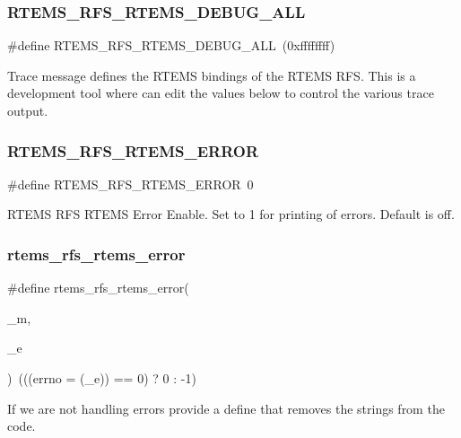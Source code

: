 \subsubsection{\texorpdfstring{RTEMS\_RFS\_RTEMS\_DEBUG\_ALL}{RTEMS\_RFS\_RTEMS\_DEBUG\_ALL}}
{\footnotesize\ttfamily \#define R\+T\+E\+M\+S\+\_\+\+R\+F\+S\+\_\+\+R\+T\+E\+M\+S\+\_\+\+D\+E\+B\+U\+G\+\_\+\+A\+LL~(0xffffffff)}

Trace message defines the R\+T\+E\+MS bindings of the R\+T\+E\+MS R\+FS. This is a development tool where can edit the values below to control the various trace output. \mbox{\label{rtems-rfs-rtems_8h_ac345c1150343a66565512a0d8640f33a}} 
\subsubsection{\texorpdfstring{RTEMS\_RFS\_RTEMS\_ERROR}{RTEMS\_RFS\_RTEMS\_ERROR}}
{\footnotesize\ttfamily \#define R\+T\+E\+M\+S\+\_\+\+R\+F\+S\+\_\+\+R\+T\+E\+M\+S\+\_\+\+E\+R\+R\+OR~0}

R\+T\+E\+MS R\+FS R\+T\+E\+MS Error Enable. Set to 1 for printing of errors. Default is off. \mbox{\label{rtems-rfs-rtems_8h_a83f026a393cb9e796b40109e1431a2e1}} 
\subsubsection{\texorpdfstring{rtems\_rfs\_rtems\_error}{rtems\_rfs\_rtems\_error}}
{\footnotesize\ttfamily \#define rtems\+\_\+rfs\+\_\+rtems\+\_\+error(\begin{DoxyParamCaption}\item[{}]{\+\_\+m,  }\item[{}]{\+\_\+e }\end{DoxyParamCaption})~(((errno = (\+\_\+e)) == 0) ? 0 \+: -\/1)}

If we are not handling errors provide a define that removes the strings from the code. \mbox{\label{rtems-rfs-rtems_8h_a5b1625eff387c2e67b182f3ec3c1e757}} 
